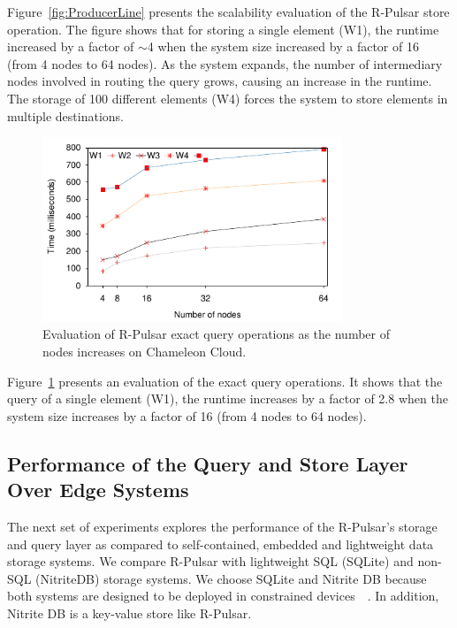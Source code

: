 Figure~\ref{fig:ProducerLine} presents the scalability evaluation of the R-Pulsar store operation. The figure shows that for storing a single element (W1), the runtime increased by a factor of $\sim$4 when the system size increased by a factor of 16 (from 4 nodes to 64 nodes). As the system expands, the number of intermediary nodes involved in routing the query grows, causing an increase in the runtime. The storage of 100 different elements (W4) forces the system to store elements in multiple destinations.

\begin{figure}[H]
  \centering
  \includegraphics[width=0.8\textwidth]{Results/ProducerLineEx.pdf}
  \caption{Evaluation of R-Pulsar exact query operations as the number of nodes increases on Chameleon Cloud.}
  \label{fig:ProducerLineEx}
\end{figure}

Figure~\ref{fig:ProducerLineEx} presents an evaluation of the exact query operations. It shows that the query of a single element (W1), the runtime increases by a factor of 2.8 when the system size increases by a factor of 16 (from 4 nodes to 64 nodes).

\subsection{Performance of the Query and Store Layer Over Edge Systems}

The next set of experiments explores the performance of the R-Pulsar's storage and query layer as compared to self-contained, embedded and lightweight data storage systems. We compare R-Pulsar with lightweight SQL (SQLite) and non-SQL (NitriteDB) storage systems. We choose SQLite and Nitrite DB because  both systems are designed to be deployed in constrained devices~\cite{sqlite}~\cite{nitrite}. In addition, Nitrite DB is a key-value store like R-Pulsar. 

